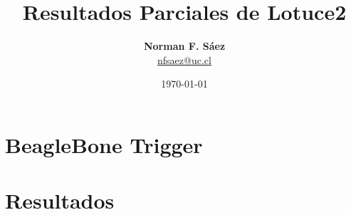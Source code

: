 \documentclass[a4paper,8pt]{article}
\title{Resultados Parciales de Lotuce2}
\author{\textbf{Norman F. Sáez}\\\url{nfsaez@uc.cl}}
\date{\today}
\begin{document}
\maketitle
\section{BeagleBone Trigger}

\section{Resultados}

\end{document}
